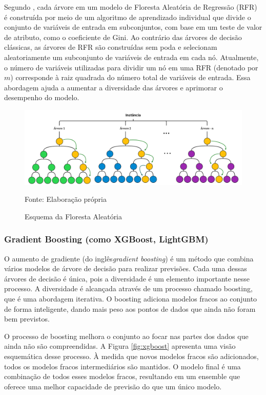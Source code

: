 Segundo , cada árvore em um modelo de Floresta Aleatória de Regressão (RFR) é construída por meio de um algoritmo de aprendizado individual que divide o conjunto de variáveis de entrada em subconjuntos, com base em um teste de valor de atributo, como o coeficiente de Gini. Ao contrário das árvores de decisão clássicas, as árvores de RFR são construídas sem poda e selecionam aleatoriamente um subconjunto de variáveis de entrada em cada nó. Atualmente, o número de variáveis utilizadas para dividir um nó em uma RFR (denotado por $m$) corresponde à raiz quadrada do número total de variáveis de entrada. Essa abordagem ajuda a aumentar a diversidade das árvores e aprimorar o desempenho do modelo.

\begin{figure}[H]
	\centering
	\caption{Esquema da Floresta Aleatória}
	\label{fig:rf}
	\includegraphics[width=0.9\linewidth]{Modelos/Figuras/RF}
	
	Fonte: Elaboração própria
\end{figure}


\subsubsection{Gradient Boosting (como XGBoost, LightGBM)}\label{subsubsec:lgbxgb}

O aumento de gradiente (do inglês\textit{gradient boosting}) é um método que combina vários modelos de árvore de decisão para realizar previsões. Cada uma dessas árvores de decisão é única, pois a diversidade é um elemento importante nesse processo. A diversidade é alcançada através de um processo chamado boosting, que é uma abordagem iterativa. O boosting adiciona modelos fracos ao conjunto de forma inteligente, dando mais peso aos pontos de dados que ainda não foram bem previstos. 

O processo de boosting melhora o conjunto ao focar nas partes dos dados que ainda não são compreendidas. A Figura \ref{fig:xgboost} apresenta uma visão esquemática desse processo. À medida que novos modelos fracos são adicionados, todos os modelos fracos intermediários são mantidos. O modelo final é uma combinação de todos esses modelos fracos, resultando em um ensemble que oferece uma melhor capacidade de previsão do que um único modelo.

